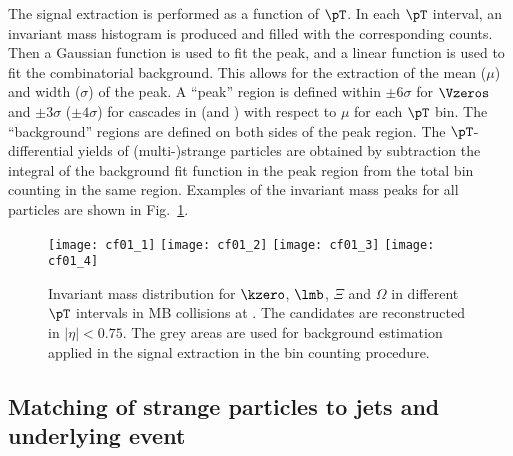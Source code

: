 \documentclass[ALICE,manyauthors]{cernphprep}
\begin{document}
The signal extraction is performed as a function of $\pT$.
In each $\pT$ interval, an invariant mass histogram is produced and filled with the corresponding counts.
Then a Gaussian function is used to fit the peak, and a linear function is used to fit the combinatorial background.
This allows for the extraction of the mean ($\mu$) and width ($\sigma$) of the peak.
A ``peak'' region is defined within $\pm 6\sigma$ for $\Vzeros$ and $\pm 3\sigma$ ($\pm 4\sigma$) for cascades in \pp (and \pPb) with respect to $\mu$ for each $\pT$ bin.
The ``background'' regions are defined on both sides of the peak region.
The $\pT$-differential yields of (multi-)strange particles are obtained by subtraction the integral of the background fit function in the peak region from the total bin counting in the same region.
Examples of the invariant mass peaks for all particles are shown in Fig.~\ref{fig:InvM}.
\begin{figure}[!ht]
	\begin{center}
		\texttt{[image: cf01\_1]}
		\texttt{[image: cf01\_2]}
		\texttt{[image: cf01\_3]}
		\texttt{[image: cf01\_4]}
		\caption{Invariant mass distribution for $\kzero$, $\lmb$, $\Xi$ and $\Omega$ in different $\pT$ intervals in MB \pPb collisions at \fivenn. The candidates are reconstructed in $|\eta|<0.75$.
			The grey areas are used for background estimation applied in the signal extraction in the bin counting procedure.}
		\label{fig:InvM}
	\end{center}
\end{figure}

\subsection{Matching of strange particles to jets and underlying event}%
\label{sec:ParJetMatch}
\end{document}
